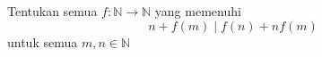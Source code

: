 Tentukan semua $f : \mathbb{N} \to \mathbb{N}$ yang memenuhi
\[
n+f(m) \mid f(n) + nf(m)
\]
untuk semua $m,n \in \mathbb{N}$
    
